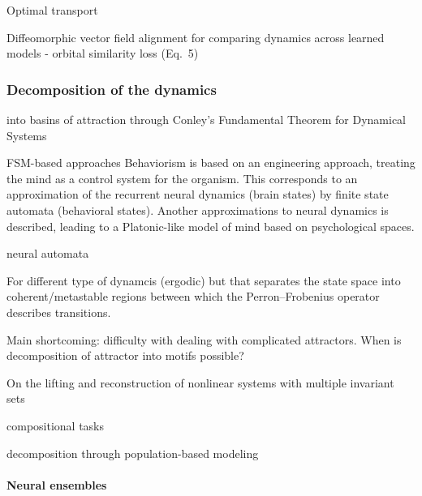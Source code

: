 \documentclass{article}
\theoremstyle{definition} \newtheorem{definition}{Definition}  \newtheorem{example}{Example}
\theoremstyle{remark} \newtheorem{remark}{Remark}
\newcounter{ct}
\begin{document}
\citep{libedinsky2023comparing}
\citep{lipshutz2024disentangling} 
\citep{nejatbakhsh2024comparing} Optimal transport
\citep{barbosa2025quantifying}

Diffeomorphic vector field alignment for comparing dynamics across learned models\citep{chen2024dform}
- orbital similarity loss (Eq.~5)



\subsubsection{Decomposition of the dynamics}\label{sec:decomposition}
into basins of attraction through Conley’s Fundamental Theorem for Dynamical Systems \citep{conley1978morse, norton1995fundamental,mischaikow1999cit}

FSM-based approaches\citep{pollack1991induction, casey1996dynamics, jacobsson2005ruleextraction, ashwin2021excitable, oliva2019fsm, cotteret2024fsm}
Behaviorism is based on an engineering approach, treating the mind as a control system for the organism. This corresponds to an approximation of the recurrent neural dynamics (brain states) by finite state automata (behavioral states). Another approximations to neural dynamics is described, leading to a Platonic-like model of mind based on psychological spaces. \citep{duch1998platonic}

neural automata\citep{goles2013neural, uria2024invariants}

For different type of dynamcis (ergodic) but that separates the state space into coherent/metastable regions between which the Perron–Frobenius operator describes transitions.

Main shortcoming: difficulty with dealing with complicated attractors.
When is decomposition of attractor into motifs possible?

On the lifting and reconstruction of nonlinear systems with multiple invariant sets \citep{pan2024lifting}

\citep{driscoll2024flexible}

compositional tasks \citep{tafazoli2024building}

decomposition through population-based modeling\citep{glaser2020recurrent} 

\citep{mudrik2024decomposed}

\paragraph{Neural ensembles}
\citep{yuste2024ensembles}
\end{document}
